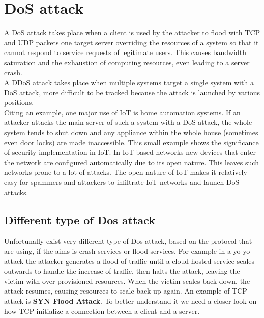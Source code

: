 \section{DoS attack}

A DoS attack takes place when a client is used by the attacker to flood with TCP and UDP packets one target server overriding the resources of a system so that it cannot respond to service requests of legitimate users. This causes bandwidth saturation and the exhaustion of computing resources, even leading to a server crash.\\
A DDoS attack takes place when multiple systems target a single system with a DoS attack, more difficult to be tracked because the attack is launched by various positions.\\ 
Citing an example, one major use of IoT is home automation 
systems. If an attacker attacks the main server of such a 
system with a DoS attack, the whole system tends to shut 
down and any appliance within the whole house (sometimes 
even door locks) are made inaccessible. This small example 
shows the significance of security implementation in IoT.
In IoT-based networks new devices that enter the 
network are configured automatically due to its open nature. 
This leaves such networks prone to a lot of attacks. The open 
nature of IoT makes it relatively easy for spammers and 
attackers to infiltrate IoT networks and launch DoS attacks. 

\subsection{Different type of Dos attack}
Unfortunally exist very different type of Dos attack, based on the protocol that are using, if the aims is crash services or flood services. For example in a yo-yo attack the attacker generates a flood of traffic until a cloud-hosted service scales outwards to handle the increase of traffic, then halts the attack, leaving the victim with over-provisioned resources. When the victim scales back down, the attack resumes, causing resources to scale back up again.
An example of TCP attack is \textbf{SYN Flood Attack}. To better understand it we need a closer look on how TCP initialize a connection between a client and a server. 

